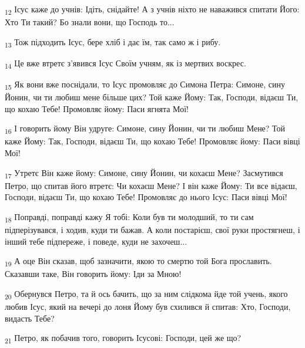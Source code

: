\begin{tcolorbox}
\textsubscript{12} Ісус каже до учнів: Ідіть, снідайте! А з учнів ніхто не наважився спитати Його: Хто Ти такий? Бо знали вони, що Господь то...
\end{tcolorbox}
\begin{tcolorbox}
\textsubscript{13} Тож підходить Ісус, бере хліб і дає їм, так само ж і рибу.
\end{tcolorbox}
\begin{tcolorbox}
\textsubscript{14} Це вже втретє з'явився Ісус Своїм учням, як із мертвих воскрес.
\end{tcolorbox}
\begin{tcolorbox}
\textsubscript{15} Як вони вже поснідали, то Ісус промовляє до Симона Петра: Симоне, сину Йонин, чи ти любиш мене більше цих? Той каже Йому: Так, Господи, відаєш Ти, що кохаю Тебе! Промовляє йому: Паси ягнята Мої!
\end{tcolorbox}
\begin{tcolorbox}
\textsubscript{16} І говорить йому Він удруге: Симоне, сину Йонин, чи ти любиш Мене? Той каже Йому: Так, Господи, відаєш Ти, що кохаю Тебе! Промовляє йому: Паси вівці Мої!
\end{tcolorbox}
\begin{tcolorbox}
\textsubscript{17} Утретє Він каже йому: Симоне, сину Йонин, чи кохаєш Мене? Засмутився Петро, що спитав його втретє: Чи кохаєш Мене? І він каже Йому: Ти все відаєш, Господи, відаєш Ти, що кохаю Тебе! Промовляє до нього Ісус: Паси вівці Мої!
\end{tcolorbox}
\begin{tcolorbox}
\textsubscript{18} Поправді, поправді кажу Я тобі: Коли був ти молодший, то ти сам підперізувався, і ходив, куди ти бажав. А коли постарієш, свої руки простягнеш, і інший тебе підпереже, і поведе, куди не захочеш...
\end{tcolorbox}
\begin{tcolorbox}
\textsubscript{19} А оце Він сказав, щоб зазначити, якою то смертю той Бога прославить. Сказавши таке, Він говорить йому: Іди за Мною!
\end{tcolorbox}
\begin{tcolorbox}
\textsubscript{20} Обернувся Петро, та й ось бачить, що за ним слідкома йде той учень, якого любив Ісус, який на вечері до лоня Йому був схилився й спитав: Хто, Господи, видасть Тебе?
\end{tcolorbox}
\begin{tcolorbox}
\textsubscript{21} Петро, як побачив того, говорить Ісусові: Господи, цей же що?
\end{tcolorbox}
